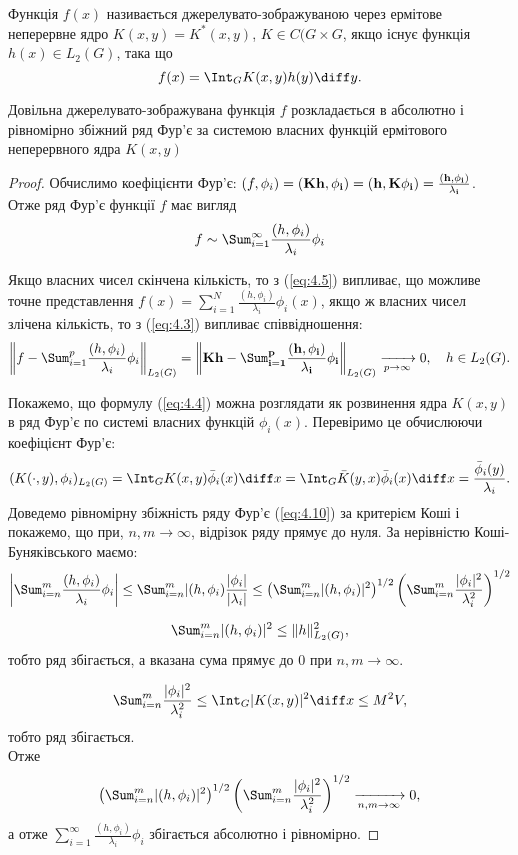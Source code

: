 Функція $f(x)$ називається джерелувато-зображуваною через ермітове неперервне ядро $K(x, y) = K^*(x, y)$, $K \in C(G \times G$, якщо існує функція $h(x) \in L_2(G)$, така що 
\begin{equation}
	\label{eq:4.9}
	f(x) = \Int_G K(x, y) h(y) \diff y.
\end{equation}
\begin{theorem}
	Довільна джерелувато-зображувана функція $f$ розкладається в абсолютно і рівномірно збіжний ряд Фур'є за системою власних функцій ермітового неперервного ядра $K(x, y)$
\end{theorem}
\begin{proof}
	Обчислимо коефіцієнти Фур'є: $(f, \phi_i) = (\bf{K}h, \phi_i) = (h, \bf{K}\phi_i) = \frac{(h,\phi_i)}{\lambda_i}$. Отже ряд Фур'є функції $f$ має вигляд 
	\begin{equation}
		\label{eq:4.10}
		f \sim \Sum_{i = 1}^\infty \dfrac{(h, \phi_i)}{\lambda_i} \phi_i
	\end{equation}

	Якщо власних чисел скінчена кількість, то з (\ref{eq:4.5}) випливає, що можливе точне представлення $f(x) = \sum_{i=1}^N \frac{(h, \phi_i)}{\lambda_i} \phi_i(x)$, якщо ж власних чисел злічена кількість, то з (\ref{eq:4.3}) випливає співвідношення: \[ \left\| f - \Sum_{i = 1}^p \dfrac{(h, \phi_i)}{\lambda_i} \phi_i \right\|_{L_2(G)} = \left\| \bf{K}h - \Sum_{i = 1}^p \dfrac{(h, \phi_i)}{\lambda_i} \phi_i \right\|_{L_2(G)} \xrightarrow[p \to \infty]{}0, \quad h \in L_2(G). \]

	Покажемо, що формулу (\ref{eq:4.4}) можна розглядати як розвинення ядра $K(x, y)$ в ряд Фур'є по системі власних функцій $\phi_i(x)$. Перевіримо це обчислюючи коефіцієнт Фур'є: \[ (K(\cdot, y),\phi_i)_{L_2(G)} = \Int_G K(x, y) \bar \phi_i(x) \diff x = \Int_G \bar K(y, x) \bar \phi_i(x) \diff x = \dfrac{\bar \phi_i(y)}{\lambda_i}. \] Доведемо рівномірну збіжність ряду Фур'є (\ref{eq:4.10}) за критерієм Коші і покажемо, що при, $n, m \to \infty$, відрізок ряду прямує до нуля. За нерівністю Коші-Буняківського маємо: \[ \left| \Sum_{i = n}^m \dfrac{(h, \phi_i)}{\lambda_i} \phi_i \right| \le \Sum_{i = n}^m |(h, \phi_i)\dfrac{|\phi_i|}{|\lambda_i|} \le \left(\Sum_{i=n}^m |(h, \phi_i)|^2\right)^{1/2} \left(\Sum_{i=n}^m \dfrac{|\phi_i|^2}{\lambda_i^2}\right)^{1/2} \]

	\[ \Sum_{i=n}^m |(h, \phi_i)|^2 \le \|h\|_{L_2(G)}^2, \] тобто ряд збігається, а вказана сума прямує до 0 при $n, m \to \infty$.

	\[ \Sum_{i=n}^m \dfrac{|\phi_i|^2}{\lambda_i^2} \le \Int_G |K(x, y)|^2 \diff x \le M^2 V, \] тобто ряд збігається. \\

	Отже \[\left(\Sum_{i=n}^m |(h, \phi_i)|^2\right)^{1/2} \left(\Sum_{i=n}^m \dfrac{|\phi_i|^2}{\lambda_i^2}\right)^{1/2} \xrightarrow[n, m \to \infty]{} 0, \]
	а отже $\sum_{i=1}^\infty \frac{(h, \phi_i)}{\lambda_i} \phi_i$ збігається абсолютно і рівномірно.
\end{proof}
